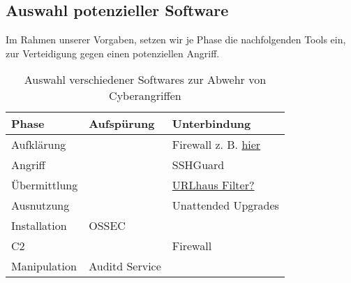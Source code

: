 \subsection{Auswahl potenzieller Software}
Im Rahmen unserer Vorgaben, setzen wir je Phase die nachfolgenden Tools ein, zur Verteidigung gegen einen potenziellen Angriff.

\begin{table}[]
    \begin{tabular}{|l|l|l|}
    \hline
    Phase        & Aufspürung     & Unterbindung        \\ \hline
    Aufklärung   &                & Firewall z. B. \href{https://feodotracker.abuse.ch/blocklist/}{hier}            \\ \hline
    Angriff      &                & SSHGuard            \\ \hline
    Übermittlung &                & \href{https://gitlab.com/malware-filter/urlhaus-filter}{URLhaus Filter?}     \\ \hline
    Ausnutzung   &                & Unattended Upgrades \\ \hline
    Installation & OSSEC          &                     \\ \hline
    C2           &                & Firewall            \\ \hline
    Manipulation & Auditd Service &                     \\ \hline
    \end{tabular}
    \caption{Auswahl verschiedener Softwares zur Abwehr von Cyberangriffen}
    \label{tab:tools_killchain}
\end{table}